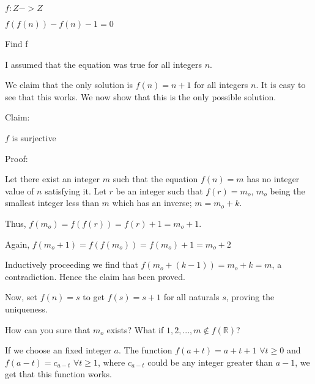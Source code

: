 \begin{solution}
	\begin{tcolorbox}$f:Z  -> Z $

$f(f(n)) - f(n) - 1 = 0$

\begin{bolded}\begin{italicized}Find f\end{italicized}\end{bolded}\end{tcolorbox}
I assumed that the equation was true for all integers $n$.
\end{solution}



\begin{solution}
	\begin{tcolorbox}We claim that the only solution is $f(n)=n+1$ for all integers $n$. It is easy to see that this works. We now show that this is the only possible solution.

\begin{bolded}Claim:\end{bolded} $f$ is surjective
\begin{italicized}Proof:\end{italicized} Let there exist an integer $m$ such that the equation $f(n)=m$ has no integer value of $n$ satisfying it.
Let $r$ be an integer such that $f(r)=m_{o}$, $m_{o}$ being the smallest integer less than $m$ which has an inverse; $m=m_{o}+k$.

Thus, $f(m_{o})=f(f(r))=f(r)+1=m_{o}+1$.

Again, $f(m_{o}+1)=f(f(m_{o}))=f(m_{o})+1=m_{o}+2$

Inductively proceeding we find that $f(m_{o}+(k-1))=m_{o}+k=m$, a contradiction.
Hence the claim has been proved.

Now, set $f(n)=s$ to get $f(s)=s+1$ for all naturals $s$, proving the uniqueness.\end{tcolorbox}

How can you sure that $m_o$ exists? What if $1,2,...,m\not\in f(\mathbb{R})$?
\end{solution}



\begin{solution}
	If we choose  an fixed integer $a$. The function $f(a+t)=a+t+1$ $\forall t  \geq 0$ and $f(a-t)=c_{a-t}$ $\forall t  \geq 1$, where $c_{a-t}$ could be any integer greater than $a-1$, we get that this function works.
\end{solution}



